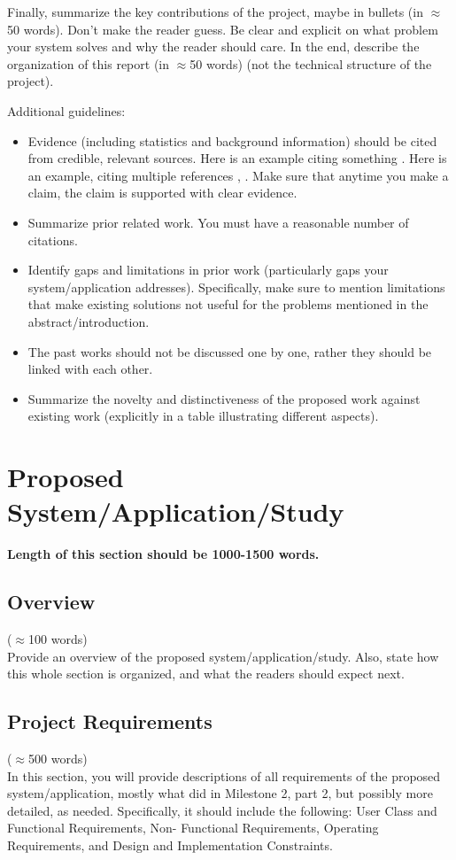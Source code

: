 \documentclass[12pt]{article}
\begin{document}
Finally, summarize the key contributions of the project, maybe in bullets (in $\approx$50 words). Don't make the reader guess. Be clear and explicit on what problem your system solves and why the reader should care.
In the end, describe the organization of this report (in $\approx$50 words) (not the technical structure of the project).

Additional guidelines:
\begin{itemize}
    \item Evidence (including statistics and background information) should be cited from credible, relevant sources. Here is an example citing something \cite{bovet2019influence}. Here is an example, citing multiple references \cite{Samonte2018Polarity}, \cite{Judith2018Fake}. Make sure that anytime you make a claim, the claim is supported with clear evidence.
    \item Summarize prior related work. You must have a reasonable number of citations.
    \item Identify gaps and limitations in prior work (particularly gaps your system/application addresses). Specifically, make sure to mention limitations that make existing solutions not useful for the problems mentioned in the abstract/introduction. 
    \item The past works should not be discussed one by one, rather they should be linked with each other.
    \item Summarize the novelty and distinctiveness of the proposed work against existing work (explicitly in a table illustrating different aspects).
\end{itemize}

\section{Proposed System/Application/Study}\label{chap:proposed}

\textbf{Length of this section should be 1000-1500 words.}

\subsection{Overview} 
($\approx$100 words)\\
Provide an overview of the proposed system/application/study. Also, state how this whole section is organized, and what the readers should expect next.

\subsection{Project Requirements}\label{sec:requirements}
($\approx$500 words)\\
In this section, you will provide descriptions of all requirements of the proposed system/application, mostly what did in Milestone 2, part 2, but possibly more detailed, as needed. Specifically, it should include the following: User Class and Functional Requirements, Non- Functional Requirements, Operating Requirements, and Design and Implementation Constraints.
\end{document}

